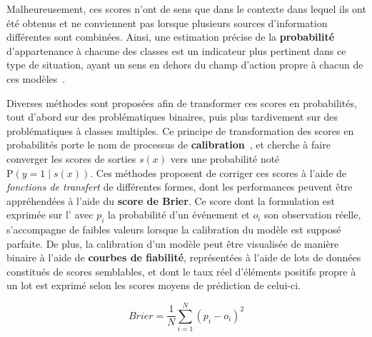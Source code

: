 Malheureusement, ces scores n'ont de sens que dans le contexte dans lequel ils ont été obtenus et ne conviennent pas lorsque plusieurs sources d'information différentes sont combinées. Ainsi, une estimation précise de la \textbf{probabilité} d'appartenance à chacune des classes est un indicateur plus pertinent dans ce type de situation, ayant un sens en dehors du champ d'action propre à chacun de ces modèles~\cite{Zadrozny2002}.\par

Diverses méthodes sont proposées afin de transformer ces scores en probabilités, tout d'abord sur des problématiques binaires, puis plus tardivement sur des problématiques à classes multiples. Ce principe de transformation des scores en probabilités porte le nom de processus de \textbf{calibration}~\cite{Murphy1977}, et cherche à faire converger les scores de sorties $s(x)$ vers une probabilité noté $\mathrm{P}(y=1 \mid s(x))$. Ces méthodes proposent de corriger ces scores à l'aide de \textit{fonctions de transfert} de différentes formes, dont les performances peuvent être appréhendées à l'aide du \textbf{score de Brier}. Ce score dont la formulation est exprimée sur l' avec $p_i$ la probabilité d'un événement et $o_i$ son observation réelle, s'accompagne de faibles valeurs lorsque la calibration du modèle est supposé parfaite. De plus, la calibration d'un modèle peut être visualisée de manière binaire à l'aide de \textbf{courbes de fiabilité}, représentées à l'aide de lots de données constitués de scores semblables, et dont le taux réel d'éléments positifs propre à un lot est exprimé selon les scores moyens de prédiction de celui-ci.\par

\begin{equation} 
    \label{eq:brier_score}
    Brier = \frac{1}{N}\sum\limits _{i=1}^{N}(p_i-o_i)^2 
\end{equation}

